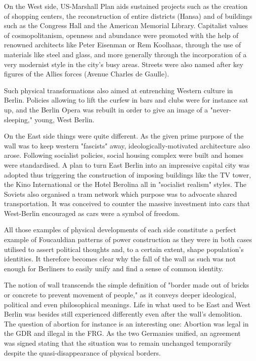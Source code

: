    On the West side, US-Marshall Plan aids sustained projects such as the
   creation of shopping centers, the reconstruction of entire districts
   (Hansa) and of buildings such as the Congress Hall and the American
   Memorial Library. Capitalist values of cosmopolitanism, openness and
   abundance were promoted with the help of renowned architects like Peter
   Eisenman or Rem Koolhaas, through the use of materials like steel and
   glass, and more generally through the incorporation of a very modernist
   style in the city's busy areas. Streets were also named after key
   figures of the Allies forces (Avenue Charles de Gaulle).

   Such physical transformations also aimed at entrenching Western culture
   in Berlin. Policies allowing to lift the curfew in bars and clubs were
   for instance sat up, and the Berlin Opera was rebuilt in order to give
   an image of a "never-sleeping," young, West Berlin.

   On the East side things were quite different. As the given prime
   purpose of the wall was to keep western "fascists" away,
   ideologically-motivated architecture also arose. Following socialist
   policies, social housing complex were built and homes were
   standardised. A plan to turn East Berlin into an impressive capital
   city was adopted thus triggering the construction of imposing buildings
   like the TV tower, the Kino International or the Hotel Berolina all in
   "socialist realism" styles. The Soviets also organised a tram network
   which purpose was to advocate shared transportation. It was conceived
   to counter the massive investment into cars that West-Berlin encouraged
   as cars were a symbol of freedom.

   All those examples of physical developments of each side constitute a
   perfect example of Foucauldian patterns of power construction as they
   were in both cases utilised to assert political thoughts and, to a
   certain extent, shape population's identities. It therefore becomes
   clear why the fall of the wall as such was not enough for Berliners to
   easily unify and find a sense of common identity.

   The notion of wall transcends the simple definition of "border made out
   of bricks or concrete to prevent movement of people," as it conveys
   deeper ideological, political and even philosophical meanings. Life in
   what used to be East and West Berlin was besides still experienced
   differently even after the wall's demolition. The question of abortion
   for instance is an interesting one: Abortion was legal in the GDR and
   illegal in the FRG. As the two Germanies unified, an agreement was
   signed stating that the situation was to remain unchanged temporarily
   despite the quasi-disappearance of physical borders.

